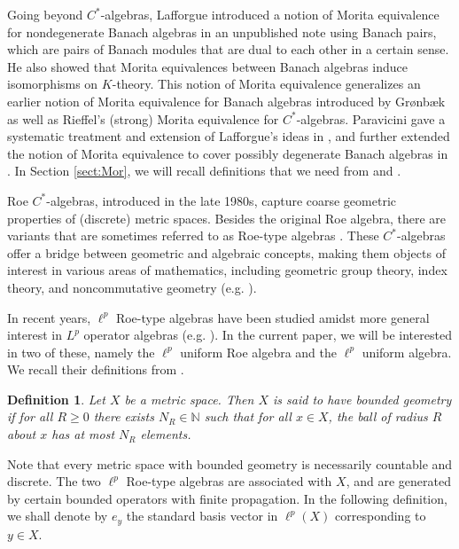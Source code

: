 \documentclass[a4,11pt]{amsart}
\newtheorem{defn}[thm]{Definition}
\theoremstyle{remark}
\begin{document}
Going beyond $C^*$-algebras, Lafforgue introduced a notion of Morita equivalence for nondegenerate Banach algebras in an unpublished note \cite{Laf04} using Banach pairs, which are pairs of Banach modules that are dual to each other in a certain sense. He also showed that Morita equivalences between Banach algebras induce isomorphisms on $K$-theory.
This notion of Morita equivalence generalizes an earlier notion of Morita equivalence for Banach algebras introduced by Gr\o{}nb\ae k \cite{Gro95,Gro96} as well as Rieffel's (strong) Morita equivalence for $C^*$-algebras.
Paravicini gave a systematic treatment and extension of Lafforgue's ideas in \cite{Par09}, and further extended the notion of Morita equivalence to cover possibly degenerate Banach algebras in \cite[Section 1.2]{Par15}.
In Section \ref{sect:Mor}, we will recall definitions that we need from \cite{Laf02} and \cite{Par09}.

Roe $C^*$-algebras, introduced in the late 1980s, capture coarse geometric properties of (discrete) metric spaces.
Besides the original Roe algebra, there are variants that are sometimes referred to as Roe-type algebras \cite[Definition 2.1]{SW13a}.
These $C^*$-algebras offer a bridge between geometric and algebraic concepts, making them objects of interest in various areas of mathematics, including geometric group theory, index theory, and noncommutative geometry (e.g. \cite{Chung20,LL,LW,SW13,SW13a,Wei,Yu00}). 

In recent years, $\ell^p$ Roe-type algebras have been studied \cite{Chung18,Chung21a,Chung23,LWZ,SW,ZZ} amidst more general interest in $L^p$ operator algebras (e.g. \cite{G21,GL,GT16,GT19,GT22,HP,Phil12,Phil13}). 
In the current paper, we will be interested in two of these, namely the $\ell^p$ uniform Roe algebra and the $\ell^p$ uniform algebra.
We recall their definitions from \cite{Chung18}.

\begin{defn}
Let $X$ be a metric space. Then $X$ is said to have \emph{bounded geometry} if for all $R\geq 0$ there exists $N_R\in\mathbb{N}$ such that for all $x\in X$, the ball of radius $R$ about $x$ has at most $N_R$ elements.
\end{defn}

Note that every metric space with bounded geometry is necessarily countable and discrete.
The two $\ell^p$ Roe-type algebras are associated with $X$, and are generated by certain bounded operators with finite propagation.
In the following definition, we shall denote by $e_y$ the standard basis vector in $\ell^p(X)$ corresponding to $y\in X$.
\end{document}
